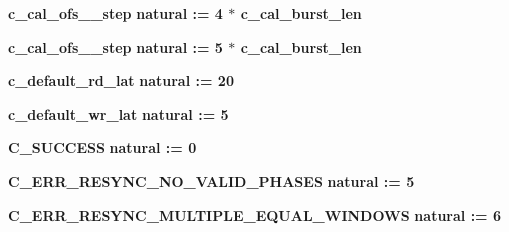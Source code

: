\begin{DoxyCompactItemize}
\item 
{\bf c\+\_\+cal\+\_\+ofs\+\_\+\_\+step} {\bfseries \textcolor{comment}{natural}\textcolor{vhdlchar}{ }\textcolor{vhdlchar}{ }\textcolor{vhdlchar}{\+:}\textcolor{vhdlchar}{=}\textcolor{vhdlchar}{ }\textcolor{vhdlchar}{ } \textcolor{vhdldigit}{4} \textcolor{vhdlchar}{$\ast$}\textcolor{vhdlchar}{ }\textcolor{vhdlchar}{ }\textcolor{vhdlchar}{ }{\bfseries {\bf c\+\_\+cal\+\_\+burst\+\_\+len}} \textcolor{vhdlchar}{ }} 
\item 
{\bf c\+\_\+cal\+\_\+ofs\+\_\+\_\+step} {\bfseries \textcolor{comment}{natural}\textcolor{vhdlchar}{ }\textcolor{vhdlchar}{ }\textcolor{vhdlchar}{\+:}\textcolor{vhdlchar}{=}\textcolor{vhdlchar}{ }\textcolor{vhdlchar}{ } \textcolor{vhdldigit}{5} \textcolor{vhdlchar}{$\ast$}\textcolor{vhdlchar}{ }\textcolor{vhdlchar}{ }\textcolor{vhdlchar}{ }{\bfseries {\bf c\+\_\+cal\+\_\+burst\+\_\+len}} \textcolor{vhdlchar}{ }} 
\item 
{\bf c\+\_\+default\+\_\+rd\+\_\+lat} {\bfseries \textcolor{comment}{natural}\textcolor{vhdlchar}{ }\textcolor{vhdlchar}{ }\textcolor{vhdlchar}{\+:}\textcolor{vhdlchar}{=}\textcolor{vhdlchar}{ }\textcolor{vhdlchar}{ } \textcolor{vhdldigit}{20} \textcolor{vhdlchar}{ }} 
\item 
{\bf c\+\_\+default\+\_\+wr\+\_\+lat} {\bfseries \textcolor{comment}{natural}\textcolor{vhdlchar}{ }\textcolor{vhdlchar}{ }\textcolor{vhdlchar}{\+:}\textcolor{vhdlchar}{=}\textcolor{vhdlchar}{ }\textcolor{vhdlchar}{ } \textcolor{vhdldigit}{5} \textcolor{vhdlchar}{ }} 
\item 
{\bf C\+\_\+\+S\+U\+C\+C\+E\+SS} {\bfseries \textcolor{comment}{natural}\textcolor{vhdlchar}{ }\textcolor{vhdlchar}{ }\textcolor{vhdlchar}{\+:}\textcolor{vhdlchar}{=}\textcolor{vhdlchar}{ }\textcolor{vhdlchar}{ } \textcolor{vhdldigit}{0} \textcolor{vhdlchar}{ }} 
\item 
{\bf C\+\_\+\+E\+R\+R\+\_\+\+R\+E\+S\+Y\+N\+C\+\_\+\+N\+O\+\_\+\+V\+A\+L\+I\+D\+\_\+\+P\+H\+A\+S\+ES} {\bfseries \textcolor{comment}{natural}\textcolor{vhdlchar}{ }\textcolor{vhdlchar}{ }\textcolor{vhdlchar}{\+:}\textcolor{vhdlchar}{=}\textcolor{vhdlchar}{ }\textcolor{vhdlchar}{ } \textcolor{vhdldigit}{5} \textcolor{vhdlchar}{ }} 
\item 
{\bf C\+\_\+\+E\+R\+R\+\_\+\+R\+E\+S\+Y\+N\+C\+\_\+\+M\+U\+L\+T\+I\+P\+L\+E\+\_\+\+E\+Q\+U\+A\+L\+\_\+\+W\+I\+N\+D\+O\+WS} {\bfseries \textcolor{comment}{natural}\textcolor{vhdlchar}{ }\textcolor{vhdlchar}{ }\textcolor{vhdlchar}{\+:}\textcolor{vhdlchar}{=}\textcolor{vhdlchar}{ }\textcolor{vhdlchar}{ } \textcolor{vhdldigit}{6} \textcolor{vhdlchar}{ }} 

\end{DoxyCompactItemize}
